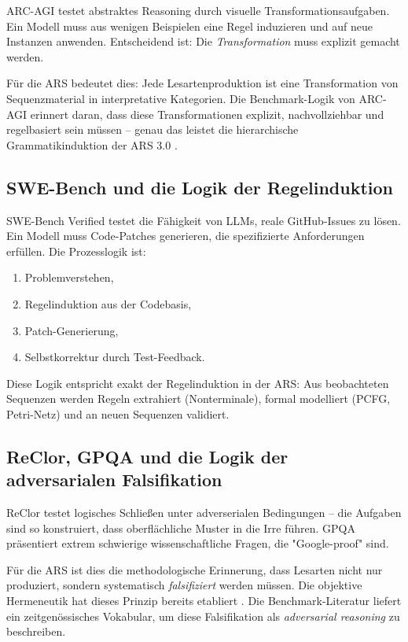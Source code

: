 \documentclass[12pt,a4paper]{article}
\begin{document}
ARC-AGI \cite{chollet2019measure} testet abstraktes Reasoning durch visuelle Transformationsaufgaben. Ein Modell muss aus wenigen Beispielen eine Regel induzieren und auf neue Instanzen anwenden. Entscheidend ist: Die \textit{Transformation} muss explizit gemacht werden.

Für die ARS bedeutet dies: Jede Lesartenproduktion ist eine Transformation von Sequenzmaterial in interpretative Kategorien. Die Benchmark-Logik von ARC-AGI erinnert daran, dass diese Transformationen explizit, nachvollziehbar und regelbasiert sein müssen – genau das leistet die hierarchische Grammatikinduktion der ARS 3.0 \cite{koop2024pcfg}.

\subsection{SWE-Bench und die Logik der Regelinduktion}

SWE-Bench Verified \cite{jimenez2024swe} testet die Fähigkeit von LLMs, reale GitHub-Issues zu lösen. Ein Modell muss Code-Patches generieren, die spezifizierte Anforderungen erfüllen. Die Prozesslogik ist:

\begin{enumerate}
    \item Problemverstehen,
    \item Regelinduktion aus der Codebasis,
    \item Patch-Generierung,
    \item Selbstkorrektur durch Test-Feedback.
\end{enumerate}

Diese Logik entspricht exakt der Regelinduktion in der ARS: Aus beobachteten Sequenzen werden Regeln extrahiert (Nonterminale), formal modelliert (PCFG, Petri-Netz) und an neuen Sequenzen validiert.

\subsection{ReClor, GPQA und die Logik der adversarialen Falsifikation}

ReClor \cite{yu2020reclor} testet logisches Schließen unter adverserialen Bedingungen – die Aufgaben sind so konstruiert, dass oberflächliche Muster in die Irre führen. GPQA \cite{rein2024gpqa} präsentiert extrem schwierige wissenschaftliche Fragen, die "Google-proof" sind.

Für die ARS ist dies die methodologische Erinnerung, dass Lesarten nicht nur produziert, sondern systematisch \textit{falsifiziert} werden müssen. Die objektive Hermeneutik hat dieses Prinzip bereits etabliert \cite{oevermann1979methodologie}. Die Benchmark-Literatur liefert ein zeitgenössisches Vokabular, um diese Falsifikation als \textit{adversarial reasoning} zu beschreiben.
\end{document}
